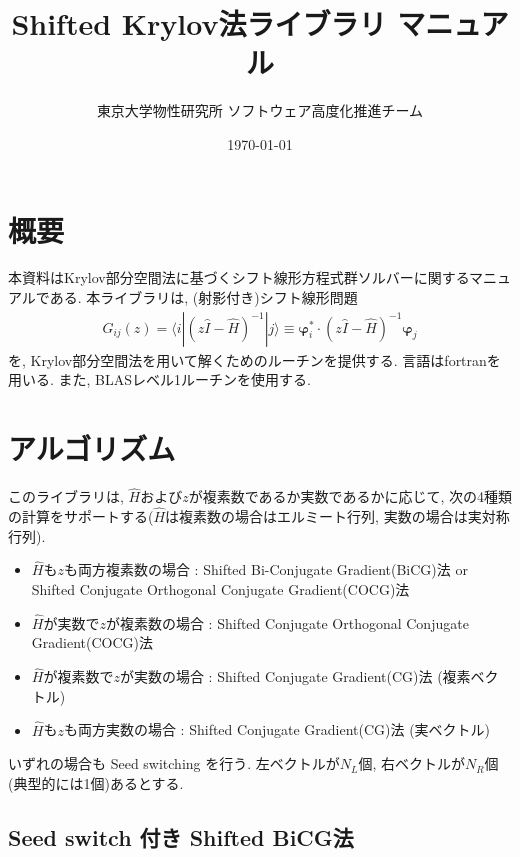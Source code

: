 \documentclass[12pt,titlepage]{jarticle}
\begin{document}
%
%
\title{Shifted Krylov法ライブラリ マニュアル}
\author{東京大学物性研究所 ソフトウェア高度化推進チーム}
\date{\today}
\maketitle
%

%
%
\tableofcontents

\section{概要}

本資料はKrylov部分空間法に基づくシフト線形方程式群ソルバーに関するマニュアルである.
本ライブラリは, (射影付き)シフト線形問題
\begin{align}
  G_{i j}(z) = \langle i | (z {\hat I} -{\hat H})^{-1}| j \rangle \equiv 
  {\boldsymbol \varphi}_i^{*} \cdot (z{\hat I}-{\hat H})^{-1} {\boldsymbol \varphi}_j
\end{align}
を, Krylov部分空間法を用いて解くためのルーチンを提供する.
言語はfortranを用いる. 
また, BLASレベル1ルーチンを使用する.

\section{アルゴリズム}

このライブラリは, ${\hat H}$および$z$が複素数であるか実数であるかに応じて,
次の4種類の計算をサポートする(${\hat H}$は複素数の場合はエルミート行列, 実数の場合は実対称行列).

\begin{itemize}
\item ${\hat H}$も$z$も両方複素数の場合 : Shifted Bi-Conjugate Gradient(BiCG)法 \cite{BiCG} or Shifted Conjugate Orthogonal Conjugate Gradient(COCG)法 \cite{COCG}
\item ${\hat H}$が実数で$z$が複素数の場合 : Shifted Conjugate Orthogonal Conjugate Gradient(COCG)法 \cite{COCG}
\item ${\hat H}$が複素数で$z$が実数の場合 : Shifted Conjugate Gradient(CG)法 (複素ベクトル)
\item ${\hat H}$も$z$も両方実数の場合 : Shifted Conjugate Gradient(CG)法 (実ベクトル)
\end{itemize}
いずれの場合も Seed switching を行う.
左ベクトルが$N_L$個, 右ベクトルが$N_R$個(典型的には1個)あるとする.

\subsection{Seed switch 付き Shifted BiCG法}
\end{document}
